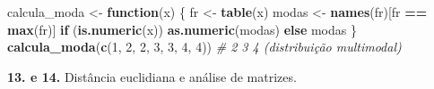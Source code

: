 \documentclass[
  portuguese,
  11pt,
  openany]{book}
\newenvironment{Shaded}{\begin{snugshade}}{\end{snugshade}}
\newcommand{\AttributeTok}[1]{\textcolor[rgb]{0.13,0.29,0.53}{#1}}
\newcommand{\CommentTok}[1]{\textcolor[rgb]{0.56,0.35,0.01}{\textit{#1}}}
\newcommand{\ControlFlowTok}[1]{\textcolor[rgb]{0.13,0.29,0.53}{\textbf{#1}}}
\newcommand{\DecValTok}[1]{\textcolor[rgb]{0.00,0.00,0.81}{#1}}
\newcommand{\FunctionTok}[1]{\textcolor[rgb]{0.13,0.29,0.53}{\textbf{#1}}}
\newcommand{\NormalTok}[1]{#1}
\newcommand{\OtherTok}[1]{\textcolor[rgb]{0.56,0.35,0.01}{#1}}
\newcommand{\SpecialCharTok}[1]{\textcolor[rgb]{0.81,0.36,0.00}{\textbf{#1}}}
\begin{document}
\begin{Shaded}
\begin{Highlighting}[]
\NormalTok{calcula\_moda }\OtherTok{\textless{}{-}} \ControlFlowTok{function}\NormalTok{(x) \{}
\NormalTok{  fr }\OtherTok{\textless{}{-}} \FunctionTok{table}\NormalTok{(x)}
\NormalTok{  modas }\OtherTok{\textless{}{-}} \FunctionTok{names}\NormalTok{(fr)[fr }\SpecialCharTok{==} \FunctionTok{max}\NormalTok{(fr)]}
  \ControlFlowTok{if}\NormalTok{ (}\FunctionTok{is.numeric}\NormalTok{(x)) }\FunctionTok{as.numeric}\NormalTok{(modas) }\ControlFlowTok{else}\NormalTok{ modas}
\NormalTok{\}}
\FunctionTok{calcula\_moda}\NormalTok{(}\FunctionTok{c}\NormalTok{(}\DecValTok{1}\NormalTok{, }\DecValTok{2}\NormalTok{, }\DecValTok{2}\NormalTok{, }\DecValTok{3}\NormalTok{, }\DecValTok{3}\NormalTok{, }\DecValTok{4}\NormalTok{, }\DecValTok{4}\NormalTok{))     }\CommentTok{\# 2 3 4 (distribuição multimodal)}
\end{Highlighting}
\end{Shaded}

\textbf{13. e 14.} Distância euclidiana e análise de matrizes.

\begin{Shaded}
\end{Shaded}
\end{document}
